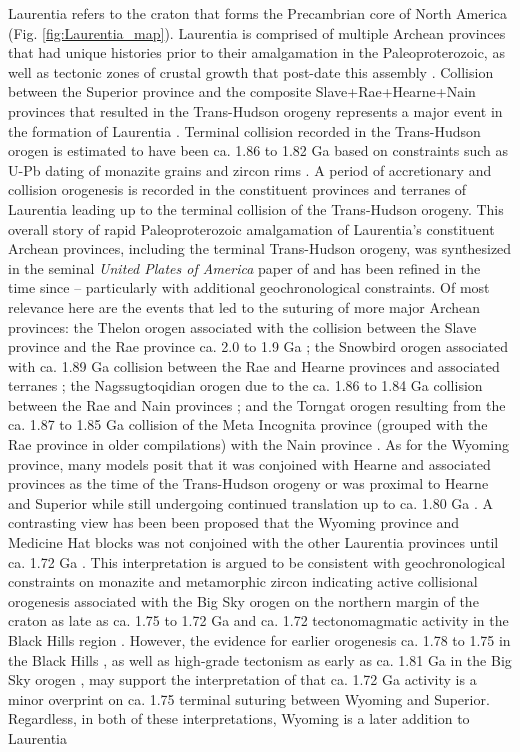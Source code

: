 \documentclass[11pt,letterpaper]{article}
\begin{document}
Laurentia refers to the craton that forms the Precambrian core of North America (Fig. \ref{fig:Laurentia_map}). Laurentia is comprised of multiple Archean provinces that had unique histories prior to their amalgamation in the Paleoproterozoic, as well as tectonic zones of crustal growth that post-date this assembly \citep{Hoffman1989a, Whitmeyer2007a}. Collision between the Superior province and the composite Slave+Rae+Hearne+Nain provinces that resulted in the Trans-Hudson orogeny represents a major event in the formation of Laurentia \citep{Corrigan2009a}. Terminal collision recorded in the Trans-Hudson orogen is estimated to have been ca. 1.86 to 1.82 Ga based on constraints such as U-Pb dating of monazite grains and zircon rims \citep[e.g.]{Skipton2016a, Weller2017a}. A period of accretionary and collision orogenesis is recorded in the constituent provinces and terranes of Laurentia leading up to the terminal collision of the Trans-Hudson orogeny. This overall story of rapid Paleoproterozoic amalgamation of Laurentia's constituent Archean provinces, including the terminal Trans-Hudson orogeny, was synthesized in the seminal \textit{United Plates of America} paper of \citet{Hoffman1988a} and has been refined in the time since -- particularly with additional geochronological constraints. Of most relevance here are the events that led to the suturing of more major Archean provinces: the Thelon orogen associated with the collision between the Slave province and the Rae province ca. 2.0 to 1.9 Ga \citep{Hoffman1989a}; the Snowbird orogen associated with ca. 1.89 Ga collision between the Rae and Hearne provinces and associated terranes \citep{Berman2007a}; the Nagssugtoqidian orogen due to the ca. 1.86 to 1.84 Ga collision between the Rae and Nain provinces \citep{St-Onge2009a}; and the Torngat orogen resulting from the ca. 1.87 to 1.85 Ga collision of the Meta Incognita province (grouped with the Rae province in older compilations) with the Nain province \citep{St-Onge2009a}. As for the Wyoming province, many models posit that it was conjoined with Hearne and associated provinces as the time of the Trans-Hudson orogeny \citep[e.g.][]{St-Onge2009a, Pehrsson2015a} or was proximal to Hearne and Superior while still undergoing continued translation up to ca. 1.80 Ga \citep{Whitmeyer2007a}. A contrasting view has been been proposed that the Wyoming province and Medicine Hat blocks was not conjoined with the other Laurentia provinces until ca. 1.72 Ga \citep{Kilian2016a}. This interpretation is argued to be consistent with geochronological constraints on monazite and metamorphic zircon indicating active collisional orogenesis associated with the Big Sky orogen on the northern margin of the craton as late as ca. 1.75 to 1.72 Ga \citep{Condit2015a} and ca. 1.72 tectonomagmatic activity in the Black Hills region \citep{Redden1990a}. However, the evidence for earlier orogenesis ca. 1.78 to 1.75 in the Black Hills \citep{Dahl1999a,Hrncir2017a}, as well as high-grade tectonism as early as ca. 1.81 Ga in the Big Sky orogen \citep{Condit2015a}, may support the interpretation of \citet{Hrncir2017a} that ca. 1.72 Ga activity is a minor overprint on ca. 1.75 terminal suturing between Wyoming and Superior. Regardless, in both of these interpretations, Wyoming is a later addition to Laurentia 
\end{document}
